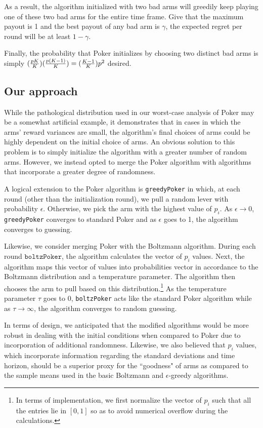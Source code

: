 \documentclass[12pt]{article}
\begin{document}
As a result, the algorithm initialized with two bad arms will greedily keep playing one of these two bad arms for the entire time frame. Give that the maximum payout is 1 and the best payout of any bad arm is $\gamma$, the expected regret per round will be at least $1-\gamma$. 

Finally, the probability that Poker initializes by choosing two distinct bad arms is simply $({pK\over{K}})({p(K-1)\over{K}}) = ({K-1\over K})p^{2}$ desired.

\subsection{Our approach}

While the pathological distribution used in our worst-case analysis of Poker may be a somewhat artificial example, it demonstrates that in cases in which the arms' reward variances are small, the algorithm's final choices of arms could be highly dependent  on the initial choice of arms. An obvious solution to this problem is to simply initialize the algorithm with a greater number of random arms. However, we instead opted to merge the Poker algorithm with algorithms that incorporate a greater degree of randomness.

A logical extension to the Poker algorithm is \texttt{greedyPoker} in which, at each round (other than the initialization round), we pull a random lever with probability $\epsilon$. Otherwise, we pick the arm with the highest value of $p_{i}$. As $\epsilon \to 0$, \texttt{greedyPoker} converges to standard Poker and as $\epsilon$ goes to 1, the algorithm converges to guessing.

Likewise, we consider merging Poker with the Boltzmann algorithm. During each round $\texttt{boltzPoker}$, the algorithm calculates the vector of $p_{i}$ values. Next, the algorithm maps this vector of values into probabilities vector in accordance to the Boltzmann distribution and a temperature parameter. The algorithm then chooses the arm to pull based on this distribution.\footnote{In terms of implementation, we first normalize the vector of $p_{i}$ such that all the entries lie in $[0,1]$ so as to avoid numerical overflow during the calculations.} As the temperature parameter $\tau$ goes to 0, \texttt{boltzPoker} acts like the standard Poker algorithm while as $\tau \to \infty$, the algorithm converges to random guessing.

In terms of design, we anticipated that the modified algorithms would be more robust in dealing with the initial conditions when compared to Poker due to incorporation of additional randomness. Likewise,  we also believed that $p_{i}$ values, which incorporate information regarding the standard deviations and time horizon, should be a superior proxy for the ``goodness" of arms as compared to the sample means used in the basic Boltzmann and $\epsilon$-greedy algorithms.
\end{document}
